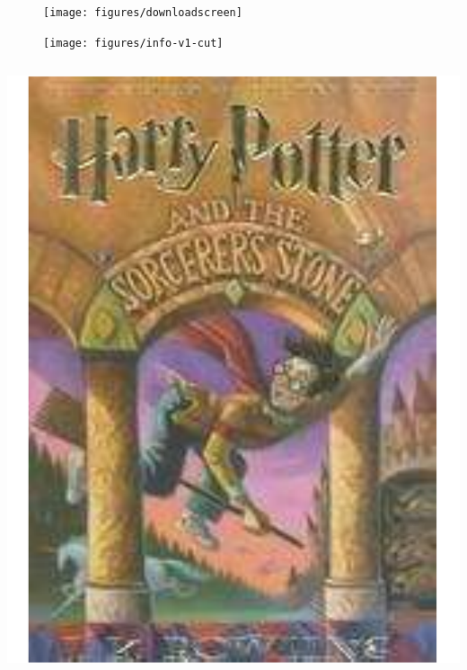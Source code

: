 \documentclass[aspectratio=169]{beamer}
\begin{document}
\begin{frame}

\begin{figure}
  \centering
  \texttt{[image: figures/downloadscreen]}
\end{figure}

\end{frame}
\begin{frame}

\begin{figure}
  \centering
  \texttt{[image: figures/info-v1-cut]}
\end{figure}

\end{frame}
\begin{frame}

  \begin{columns}
     \begin{block}{}
       \includegraphics[width=\textwidth]{figures/hp-cover.pdf}
     \end{block}


\end{columns}
\end{frame}
\end{document}
